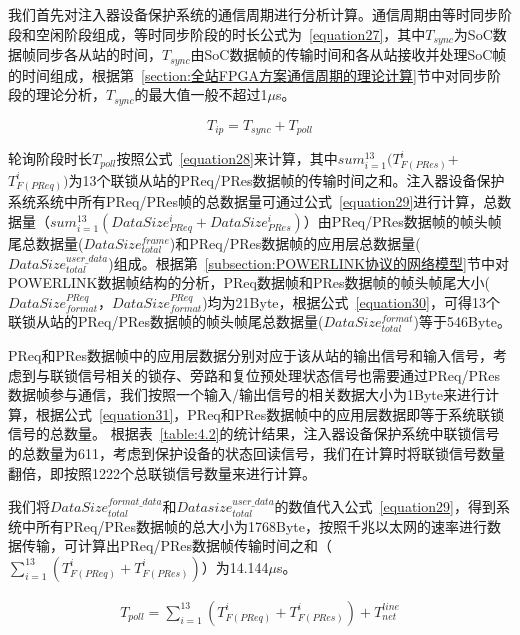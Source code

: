 我们首先对注入器设备保护系统的通信周期进行分析计算。通信周期由等时同步阶段和空闲阶段组成，等时同步阶段的时长公式为~\ref{equation27}，其中$T_{sync}$为SoC数据帧同步各从站的时间，$T_{sync}$由SoC数据帧的传输时间和各从站接收并处理SoC帧的时间组成，根据第~\ref{section:全站FPGA方案通信周期的理论计算}节中对同步阶段的理论分析，$T_{sync}$的最大值一般不超过1$\mu$s。

\begin{equation}
\label{equation27}
T_{ip}=T_{sync}+T_{poll}
\end{equation}

轮询阶段时长$T_{poll}$按照公式~\ref{equation28}来计算，其中$sum_{i=1}^{13}(T_{F(PRes)}^{i}$+$T_{F(PReq)}^{i})$为13个联锁从站的PReq/PRes数据帧的传输时间之和。注入器设备保护系统系统中所有PReq/PRes帧的总数据量可通过公式~\ref{equation29}进行计算，总数据量（$sum_{i=1}^{13}(DataSize_{PReq}^{i}+DataSize_{PRes}^{i})$）由PReq/PRes数据帧的帧头帧尾总数据量($DataSize_{total}^{frame}$)和PReq/PRes数据帧的应用层总数据量($DataSize_{total}^{user\_data}$)组成。根据第~\ref{subsection:POWERLINK协议的网络模型}节中对POWERLINK数据帧结构的分析，PReq数据帧和PRes数据帧的帧头帧尾大小($DataSize_{format}^{PReq}$，$DataSize_{format}^{PReq}$)均为21Byte，根据公式~\ref{equation30}，可得13个联锁从站的PReq/PRes数据帧的帧头帧尾总数据量($DataSize_{total}^{format}$)等于546Byte。

PReq和PRes数据帧中的应用层数据分别对应于该从站的输出信号和输入信号，考虑到与联锁信号相关的锁存、旁路和复位预处理状态信号也需要通过PReq/PRes数据帧参与通信，我们按照一个输入/输出信号的相关数据大小为1Byte来进行计算，根据公式~\ref{equation31}，PReq和PRes数据帧中的应用层数据即等于系统联锁信号的总数量。
根据表~\ref{table:4.2}的统计结果，注入器设备保护系统中联锁信号的总数量为611，考虑到保护设备的状态回读信号，我们在计算时将联锁信号数量翻倍，即按照1222个总联锁信号数量来进行计算。


我们将$DataSize_{total}^{format\_data}$和$Datasize_{total}^{user\_data}$的数值代入公式~\ref{equation29}，得到系统中所有PReq/PRes数据帧的总大小为1768Byte，按照千兆以太网的速率进行数据传输，可计算出PReq/PRes数据帧传输时间之和（$\sum_{i=1}^{13}(T_{F(PReq)}^{i}+T_{F(PRes)}^{i})$）为14.144$\mu$s。

\begin{equation}
\begin{split}
\label{equation28}
T_{poll}=\sum_{i=1}^{13}(T_{F(PReq)}^{i}+T_{F(PRes)}^{i})+T_{net}^{line}\\
\end{split}
\end{equation}

